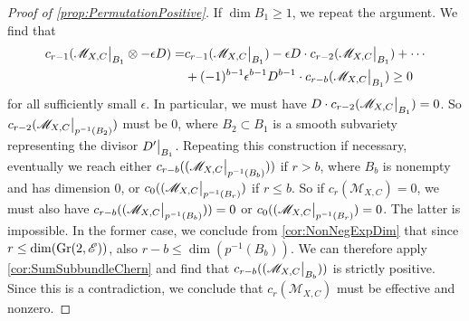 \begin{proof}[Proof of \cref{prop:PermutationPositive}]
If $\dim B_1 \geq 1$, we repeat the argument. We find that
\begin{align*}
   c_{r-1}(\restr{\mathscr{M}_{X,C}}{B_1} \otimes - \epsilon D) = &c_{r-1}(\restr{\mathscr{M}_{X,C}}{B_1})  - \epsilon D \insec c_{r-2}(\restr{\mathscr{M}_{X,C}}{B_1}) + \cdots \\ &+ (-1)^{b-1}\epsilon^{b-1}D^{b-1} \insec c_{r-b}(\restr{\mathscr{M}_{X,C}}{B_1}) \geq 0 
\end{align*}
for all sufficiently small $\epsilon$. In particular, we must have $D \insec c_{r-2}(\restr{\mathscr{M}_{X,C}}{B_1}) = 0$. So $c_{r-2}(\restr{\mathscr{M}_{X,C}}{p^{-1}(B_2)})$ must be 0, where $B_2 \subset B_1$ is a smooth subvariety representing the divisor $\restr{D'}{B_1}$. Repeating this construction if necessary, eventually we reach either $c_{r-b}((\restr{\mathscr{M}_{X,C}}{p^{-1}(B_b)}))$ if $r > b$, where $B_b$ is nonempty and has dimension 0, or $c_0((\restr{\mathscr{M}_{X,C}}{p^{-1}(B_r)})$ if $r \leq b$. So if $c_r(\mathscr{M}_{X,C})=0$, we must also have $c_{r-b}((\restr{\mathscr{M}_{X,C}}{p^{-1}(B_b)})) = 0$ or $c_0((\restr{\mathscr{M}_{X,C}}{p^{-1}(B_r)}) = 0$. The latter is impossible. In the former case, we conclude from \cref{cor:NonNegExpDim} that since $r \leq \dim(\operatorname{Gr}(2,\mathscr{E}))$, also $r-b \leq \dim(p^{-1}(B_b))$. We can therefore apply \cref{cor:SumSubbundleChern} and find that $c_{r-b}((\restr{\mathscr{M}_{X,C}}{B_b}))$ is strictly positive. Since this is a contradiction, we conclude that $c_r(\mathscr{M}_{X,C})$ must be effective and nonzero.






\end{proof}
